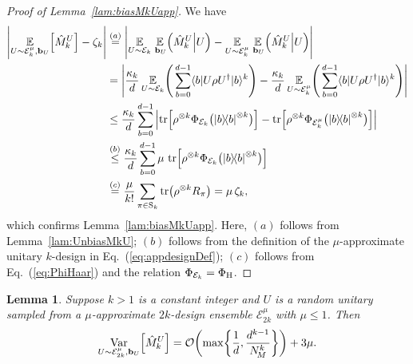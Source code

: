 \documentclass[aps,prl,twocolumn,nofootinbib,superscriptaddress,10pt]{revtex4-2}
\let\originalleft\left
\let\originalright\right
\renewcommand{\left}{\mathopen{}\mathclose\bgroup\originalleft}
\renewcommand{\right}{\aftergroup\egroup\originalright}
\def\E{ {\mathbb E} } %
\def\>{\rangle}
\def\<{\langle}
\newcommand{\ketbra}[2]{\ensuremath{\left|#1\right\rangle\!\left\langle#2\right|}}
\DeclareMathOperator{\Var}{Var}
\DeclareMathOperator{\Tr}{tr}
\newcommand{\bigo}[1]{\mathcal{O}\left(#1\right)}
\theoremstyle{plain}
\newtheorem{lemma}{Lemma}
\theoremstyle{definition}
\newcommand{\eref}[1]{Eq.~\textup{(\ref{#1})}}
\newcommand{\lref}[1]{Lemma~\ref{#1}}
\begin{document}
\begin{proof}[Proof of \lref{lam:biasMkUapp}]
We have
\begin{align}
\left| \underset{U\sim \mathcal E_{k}^\mu,  \mathbf{b}_{U}}{\E}\left[ \hat{M}_k^{U}\right] -\zeta_k  \right| 
&\stackrel{(a)}{=} 
\left| 
 \underset{U\sim \mathcal E_{k}}{\E} \, \underset{\,\mathbf{b}_{U}}{\E} \left( \hat{M}_k^{U} \Big| U \right)
-\underset{U\sim \mathcal E_{k}^\mu}{\E} \, \underset{\,\mathbf{b}_{U}}{\E} \left( \hat{M}_k^{U} \Big| U \right)
\right|
\nonumber \\
&=
\left| 
 \frac{\kappa_k}{d}\, \underset{U\sim \mathcal E_{k}}{\E}  \left( \, \sum_{b=0}^{d-1} \<b|U\rho U^{\dag}|b\>^k \right) 
-\frac{\kappa_k}{d}\, \underset{U\sim \mathcal E_{k}^\mu}{\E} \left(  \, \sum_{b=0}^{d-1} \<b|U\rho U^{\dag}|b\>^k \right) 
\right|
\nonumber \\
&\leq \frac{\kappa_k}{d} \sum_{b=0}^{d-1}  \,
\left| 
 \Tr \left[ \rho^{\otimes k}  \Phi_{\mathcal E_{k}} \big( \ketbra{b}{b}^{\otimes k} \big) \right] 
-\Tr \left[ \rho^{\otimes k}  \Phi_{\mathcal E_{k}^\mu} \big( \ketbra{b}{b}^{\otimes k} \big) \right]  
\right| 
\nonumber \\
&\stackrel{(b)}{\leq}  \frac{\kappa_k}{d} \sum_{b=0}^{d-1}  \mu\,\Tr \left[ \rho^{\otimes k}  \Phi_{\mathcal E_{k}} \big( \ketbra{b}{b}^{\otimes k} \big) \right]
\nonumber \\
&%
\stackrel{(c)}{=} \frac{\mu}{k!} \sum_{\pi\in \mathrm{S}_k}\Tr\left(\rho^{\otimes k}R_\pi\right)
= \mu\, \zeta_k , 
\end{align}
which confirms \lref{lam:biasMkUapp}. 
Here, $(a)$ follows from \lref{lam:UnbiasMkU};  
$(b)$ follows from the definition of the $\mu$-approximate unitary $k$-design in \eref{eq:appdesignDef}; $(c)$ follows from \eref{eq:PhiHaar} and the relation $\Phi_{\mathcal E_{k}}=\Phi_{\rm H}$. 
\end{proof}


\begin{lemma}\label{lem:MomVarianceApp}
Suppose $k>1$ is a constant integer and $U$ is a random unitary sampled from a $\mu$-approximate $2k$-design ensemble $\mathcal E_{2k}^\mu$ with $\mu\le1$. Then 
\begin{align}
\underset{U\sim \mathcal E_{2k}^\mu,  \mathbf{b}_{U}}{\Var} \left[\hat{M}_k^{U}\right] 
=  \bigo{\max\left\lbrace \frac{1}{d} ,\frac{d^{k-1}}{N_{\!M}^{k}}\right\rbrace } +3\mu.
\end{align}
\end{lemma}
\end{document}
